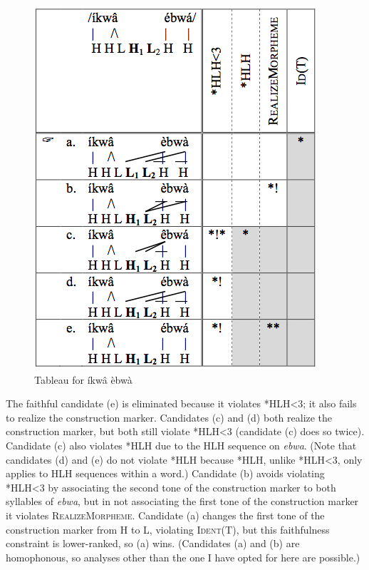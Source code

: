 \documentclass[output=paper]{langscibook}
\begin{document}
  
\begin{figure}
\includegraphics[width=\textwidth]{figures/glewwe-img8.png}
\caption{Tableau for \textup{íkwâ èbwà}\label{fig:glewwe:9}}
\end{figure}

The faithful candidate (e) is eliminated because it violates *HLH<3; it also fails to realize the construction marker. Candidates (c) and (d) both realize the construction marker, but both still violate *HLH<3 (candidate (c) does so twice). Candidate (c) also violates *HLH due to the HLH sequence on \textit{ebwa}. (Note that candidates (d) and (e) do not violate *HLH because *HLH, unlike *HLH<3, only applies to HLH sequences within a word.) Candidate (b) avoids violating *HLH<3 by associating the second tone of the construction marker to both syllables of \textit{ebwa}, but in not associating the first tone of the construction marker it violates \textsc{RealizeMorpheme}. Candidate (a) changes the first tone of the construction marker from H to L, violating \textsc{Ident(T)}, but this faithfulness constraint is lower-ranked, so (a) wins. (Candidates (a) and (b) are homophonous, so analyses other than the one I have opted for here are possible.)    
\end{document}
